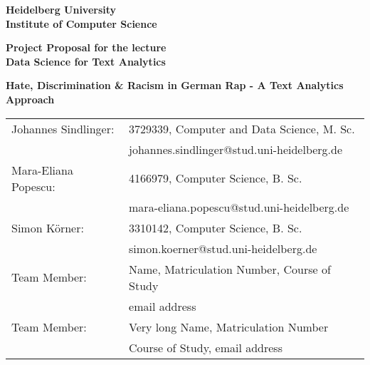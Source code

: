 \documentclass[
     12pt,         %
     a4paper,      %
     BCOR10mm,     %
     DIV14,        %
     ]{article}
\begin{document}
\begin{titlepage}


\vspace*{1cm}
\begin{center}
\vspace*{3cm}
\textbf{ 
\Large Heidelberg University\\
\smallskip
\Large Institute of Computer Science\\
\smallskip
}

\vspace{3cm}

\textbf{\large Project Proposal for the lecture \\  Data Science for Text Analytics}

\vspace{0.5\baselineskip}
{\huge
\textbf{Hate, Discrimination \& Racism in German Rap - A Text Analytics Approach}
}
\end{center}

\vfill 

{\large
\begin{tabular}[l]{ll}
Johannes Sindlinger: & 3729339, Computer and Data Science, M. Sc.\\
  & johannes.sindlinger@stud.uni-heidelberg.de\\
Mara-Eliana Popescu: & 4166979, Computer Science, B. Sc. \\
  & mara-eliana.popescu@stud.uni-heidelberg.de\\
Simon Körner: & 3310142, Computer Science, B. Sc.\\
  & simon.koerner@stud.uni-heidelberg.de\\
Team Member: & Name, Matriculation Number, Course of Study\\
  & email address\\

Team Member: & Very long Name, Matriculation Number\\
  & Course of Study, email address\\
  
\end{tabular}
}

\end{titlepage}










\end{document}
